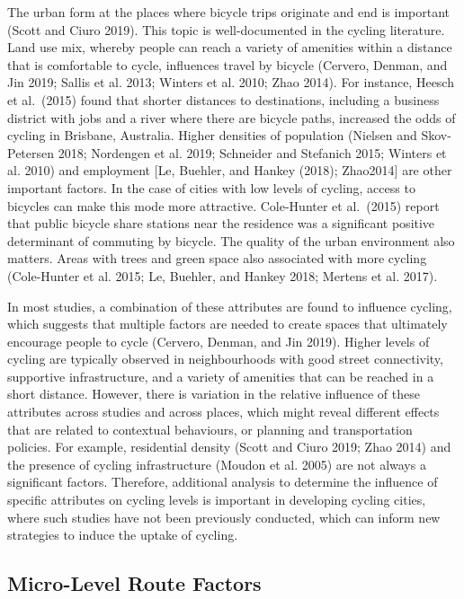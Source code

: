 \documentclass[smallextended]{svjour3}       %
\begin{document}
The urban form at the places where bicycle trips originate and end is
important (Scott and Ciuro 2019). This topic is well-documented in the
cycling literature. Land use mix, whereby people can reach a variety of
amenities within a distance that is comfortable to cycle, influences
travel by bicycle (Cervero, Denman, and Jin 2019; Sallis et al. 2013;
Winters et al. 2010; Zhao 2014). For instance, Heesch et al.~(2015)
found that shorter distances to destinations, including a business
district with jobs and a river where there are bicycle paths, increased
the odds of cycling in Brisbane, Australia. Higher densities of
population (Nielsen and Skov-Petersen 2018; Nordengen et al. 2019;
Schneider and Stefanich 2015; Winters et al. 2010) and employment {[}Le,
Buehler, and Hankey (2018); Zhao2014{]} are other important factors. In
the case of cities with low levels of cycling, access to bicycles can
make this mode more attractive. Cole-Hunter et al.~(2015) report that
public bicycle share stations near the residence was a significant
positive determinant of commuting by bicycle. The quality of the urban
environment also matters. Areas with trees and green space also
associated with more cycling (Cole-Hunter et al. 2015; Le, Buehler, and
Hankey 2018; Mertens et al. 2017).

In most studies, a combination of these attributes are found to
influence cycling, which suggests that multiple factors are needed to
create spaces that ultimately encourage people to cycle (Cervero,
Denman, and Jin 2019). Higher levels of cycling are typically observed
in neighbourhoods with good street connectivity, supportive
infrastructure, and a variety of amenities that can be reached in a
short distance. However, there is variation in the relative influence of
these attributes across studies and across places, which might reveal
different effects that are related to contextual behaviours, or planning
and transportation policies. For example, residential density (Scott and
Ciuro 2019; Zhao 2014) and the presence of cycling infrastructure
(Moudon et al. 2005) are not always a significant factors. Therefore,
additional analysis to determine the influence of specific attributes on
cycling levels is important in developing cycling cities, where such
studies have not been previously conducted, which can inform new
strategies to induce the uptake of cycling.

\hypertarget{route}{%
\subsection{Micro-Level Route Factors}\label{route}}
\end{document}
